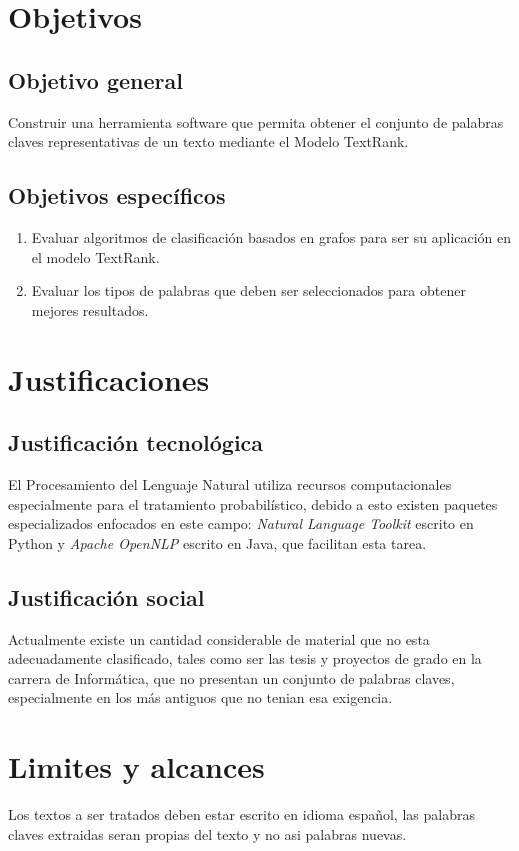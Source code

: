 \section{Objetivos}

\subsection{Objetivo general}
Construir una herramienta software que permita obtener el conjunto de palabras claves
representativas de un texto mediante el Modelo TextRank.

\subsection{Objetivos espec\'ificos}
\begin{enumerate}
	\item Evaluar algoritmos de clasificaci\'on basados en grafos para ser su
	aplicaci\'on en el modelo TextRank.
	\item Evaluar los tipos de palabras que deben ser seleccionados para obtener mejores
	resultados.
\end{enumerate}

\section{Justificaciones}
\subsection{Justificaci\'on tecnol\'ogica}
El Procesamiento del Lenguaje Natural utiliza recursos computacionales especialmente
para el tratamiento probabil\'istico, debido a esto existen paquetes especializados
enfocados en este campo: \emph{Natural Language Toolkit} escrito en Python y
\emph{Apache OpenNLP} escrito en Java, que facilitan esta tarea.

\subsection{Justificaci\'on social}
Actualmente existe un cantidad considerable de material que no esta adecuadamente
clasificado, tales como ser las tesis y proyectos de grado en la carrera de 
Inform\'atica, que no presentan un conjunto de palabras claves, especialmente en
los m\'as antiguos que no tenian esa exigencia.


\section{Limites y alcances}
Los textos a ser tratados deben estar escrito en idioma espa\~nol, las palabras claves
extraidas seran propias del texto y no asi palabras nuevas.
